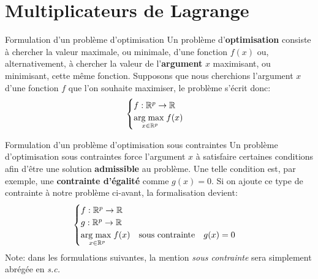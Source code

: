 \section[Multiplicateurs de Lagrange]{Multiplicateurs de Lagrange}

\begin{frame}{Formulation d'un problème d'optimisation}
	Un problème d'\textbf{optimisation} consiste à chercher la valeur maximale, ou minimale, d'une fonction $f(x)$ ou, alternativement, à chercher la valeur de l'\textbf{argument} $x$ maximisant, ou minimisant, cette même fonction. Supposons que nous cherchions l'argument $x$ d'une fonction $f$ que l'on souhaite maximiser, le problème s'écrit donc: \\
	\begin{equation}
		\begin{cases}
			f: \mathbb{R}^p \to \mathbb{R} \\
			\underset{x \in \mathbb{R}^p}{\operatorname{arg\;max}\;} f(x)
		\end{cases}
		\nonumber
	\end{equation}
\end{frame}

\begin{frame}{Formulation d'un problème d'optimisation sous contraintes}
	Un problème d'optimisation sous contraintes force l'argument $x$ à satisfaire certaines conditions afin d'être une solution \textbf{admissible} au problème. Une telle condition est, par exemple, une \textbf{contrainte d'égalité} comme $g(x) = 0$. Si on ajoute ce type de contrainte à notre problème ci-avant, la formalisation devient:
	\begin{equation}
		\begin{cases}
			f: \mathbb{R}^p \to \mathbb{R} \\
			g: \mathbb{R}^p \to \mathbb{R} \\
			\underset{x \in \mathbb{R}^p}{\operatorname{arg\;max}\;} f(x) \quad \text{sous contrainte} \quad g(x) = 0
		\end{cases}
		\nonumber
	\end{equation}
	\pause
	Note: dans les formulations suivantes, la mention \textit{sous contrainte} sera simplement abrégée en \textit{s.c.}
\end{frame}

